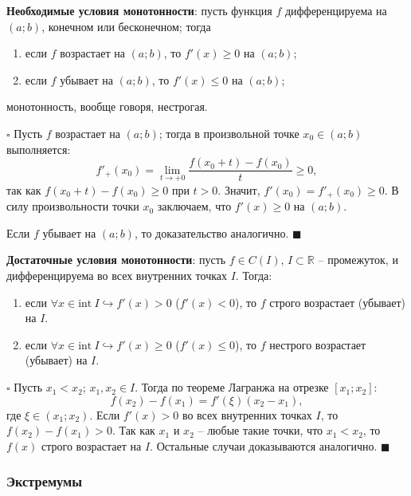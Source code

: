 \documentclass[12pt, a4paper, reqno]{article}
\begin{document}
    \textbf{Необходимые условия монотонности}: пусть функция $f$ дифференцируема на $(a; b)$,
    конечном или бесконечном; тогда
    \begin{enumerate}
        \item если $f$ возрастает на $(a; b)$, то $f'(x) \geq 0$ на $(a; b)$;
        \item если $f$ убывает на $(a; b)$, то $f'(x) \leq 0$ на $(a; b)$;
    \end{enumerate}
    монотонность, вообще говоря, нестрогая.

    $\square$ Пусть $f$ возрастает на $(a; b)$; тогда в произвольной точке $x_0\in(a; b)$
    выполняется:
    \begin{equation*}
        f'_{+}(x_0) = \lim\limits_{t\to +0} \dfrac{f(x_0 + t) - f(x_0)}{t} \geq 0,
    \end{equation*}
    так как $f(x_0 + t) - f(x_0) \geq 0$ при $t > 0$. Значит, $f'(x_0) = f'_{+}(x_0) \geq 0$. В силу
    произвольности точки $x_0$ заключаем, что $f'(x) \geq 0$ на $(a; b)$.

    Если $f$ убывает на $(a; b)$, то доказательство аналогично. $\blacksquare$

    \textbf{Достаточные условия монотонности}: пусть $f \in C(I)$, $I \subset \mathbb{R}$ -- промежуток,
    и дифференцируема во всех внутренних точках $I$. Тогда:
    \begin{enumerate}
        \item если $\forall x \in \text{int}\ I \hookrightarrow f'(x) > 0$ ($f'(x) < 0$),
              то $f$ строго возрастает (убывает) на $I$.
        \item если $\forall x \in \text{int}\ I \hookrightarrow f'(x) \geq 0$ ($f'(x) \leq 0$),
              то $f$ нестрого возрастает (убывает) на $I$.
    \end{enumerate}

    $\square$ Пусть $x_1 < x_2$; $x_1, x_2\in I$. Тогда по теореме Лагранжа на отрезке $[x_1; x_2]$:
    \begin{equation*}
        f(x_2) - f(x_1) = f'(\xi)(x_2 - x_1),
    \end{equation*}
    где $\xi\in(x_1; x_2)$. Если $f'(x) > 0$ во всех внутренних точках $I$, то $f(x_2) - f(x_1) > 0$.
    Так как $x_1$ и $x_2$ -- любые такие точки, что $x_1 < x_2$, то $f(x)$ строго возрастает на $I$.
    Остальные случаи доказываются аналогично. $\blacksquare$

    \subsubsection{Экстремумы}
\end{document}
